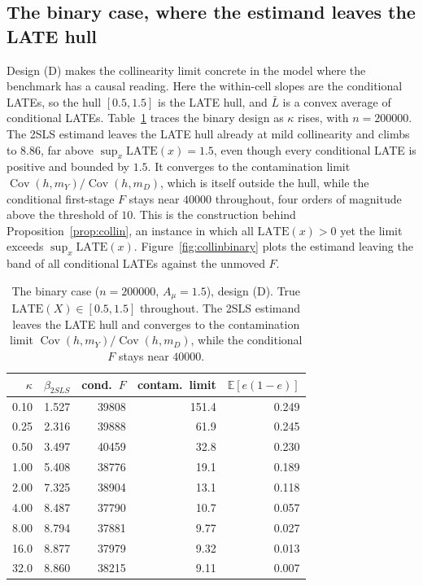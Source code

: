 \documentclass[preprint,11pt,authoryear]{elsarticle}
\theoremstyle{definition}
\newcommand{\E}{\mathbb{E}}
\newcommand{\Cov}{\operatorname{Cov}}
\newcommand{\late}{\mathrm{LATE}}
\begin{document}
\subsection{The binary case, where the estimand leaves the LATE hull}\label{sec:mcbinary}
Design (D) makes the collinearity limit concrete in the model where the benchmark has a
causal reading. Here the within-cell slopes are the conditional LATEs, so the hull
$[0.5,1.5]$ is the LATE hull, and $\bar L$ is a convex average of conditional
LATEs. Table~\ref{tab:collinbinary} traces the binary design as $\kappa$ rises, with
$n=\num{200000}$. The 2SLS estimand leaves the LATE hull already at mild collinearity and
climbs to $8.86$, far above $\sup_x\late(x)=1.5$, even though every conditional LATE is
positive and bounded by $1.5$. It converges to the contamination limit
$\Cov(h,m_Y)/\Cov(h,m_D)$, which is itself outside the hull, while the conditional first-stage
$F$ stays near $\num{40000}$ throughout, four orders of magnitude above the threshold of
$10$. This is the construction behind Proposition~\ref{prop:collin}, an instance in which
all $\late(x)>0$ yet the limit exceeds $\sup_x\late(x)$. Figure~\ref{fig:collinbinary} plots
the estimand leaving the band of all conditional LATEs against the unmoved $F$.

\begin{table}[t]\centering
\caption{The binary case ($n=\num{200000}$, $A_\mu=1.5$), design (D). True
$\late(X)\in[0.5,1.5]$ throughout. The 2SLS estimand leaves the LATE hull and converges to
the contamination limit $\Cov(h,m_Y)/\Cov(h,m_D)$, while the conditional $F$ stays near
$\num{40000}$.}
\label{tab:collinbinary}
\begin{tabular}{rrrrr}
\toprule
$\kappa$ & $\beta_{2SLS}$ & cond.\ $F$ & contam.\ limit & $\E[e(1-e)]$\\
\midrule
0.10 & 1.527 & \num{39808} & 151.4 & 0.249\\
0.25 & 2.316 & \num{39888} & 61.9  & 0.245\\
0.50 & 3.497 & \num{40459} & 32.8  & 0.230\\
1.00 & 5.408 & \num{38776} & 19.1  & 0.189\\
2.00 & 7.325 & \num{38904} & 13.1  & 0.118\\
4.00 & 8.487 & \num{37790} & 10.7  & 0.057\\
8.00 & 8.794 & \num{37881} & 9.77  & 0.027\\
16.0 & 8.877 & \num{37979} & 9.32  & 0.013\\
32.0 & 8.860 & \num{38215} & 9.11  & 0.007\\
\bottomrule
\end{tabular}
\end{table}
\end{document}
